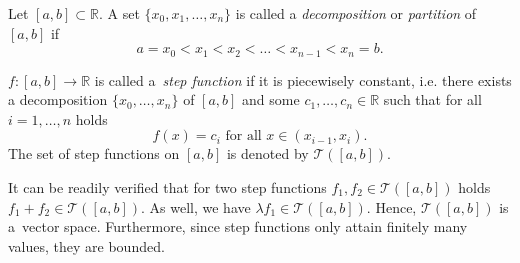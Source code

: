 

\begin{Definition}{}
Let $[a,b]\subset\mathbb{R}$. A set $\{x_{0},x_{1},\ldots,x_{n}\}$ is called a \emph{decomposition} or \emph{partition} of $[a,b]$ if
$$a=x_0<x_1<x_2<\ldots<x_{n-1}<x_n=b.$$
\end{Definition}




\begin{Definition}
$f:[a,b]\to\mathbb{R}$ is called a~\emph{step function} if it is piecewisely constant, i.e. there exists a decomposition $\{x_{0},\ldots,x_{n}\}$ of $[a,b]$ and some $c_1,\ldots,c_n\in\mathbb{R}$ such that for all $i=1,\ldots,n$ holds
\[f(x)=c_i\text{ for all }x\in(x_{i-1},x_i).\]
The set of step functions on $[a,b]$ is denoted by $\mathcal{T}([a,b])$.
\end{Definition}



It can be readily verified that for two step functions $f_1,f_2\in \mathcal{T}([a,b])$ holds
$f_1+f_2\in \mathcal{T}([a,b])$. As well, we have $\lambda f_1\in \mathcal{T}([a,b])$.  Hence, $\mathcal{T}([a,b])$ is a~vector space. Furthermore, since step functions only attain finitely many values, they are bounded.


